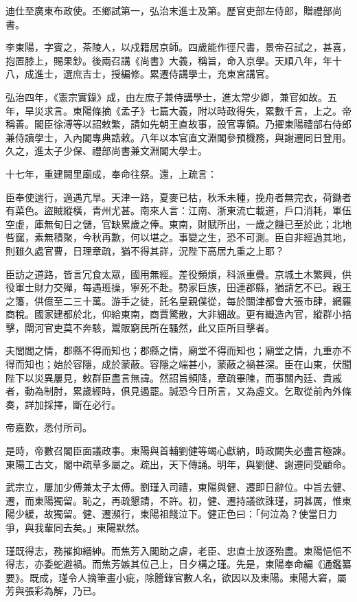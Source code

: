 \begin{pinyinscope}
迪仕至廣東布政使。丕鄉試第一，弘治末進士及第。歷官吏部左侍郎，贈禮部尚書。

李東陽，字賓之，茶陵人，以戍籍居京師。四歲能作徑尺書，景帝召試之，甚喜，抱置膝上，賜果鈔。後兩召講《尚書》大義，稱旨，命入京學。天順八年，年十八，成進士，選庶吉士，授編修。累遷侍講學士，充東宮講官。

弘治四年，《憲宗實錄》成，由左庶子兼侍講學士，進太常少卿，兼官如故。五年，旱災求言。東陽條摘《孟子》七篇大義，附以時政得失，累數千言，上之。帝稱善。閣臣徐溥等以詔敕繁，請如先朝王直故事，設官專領。乃擢東陽禮部右侍郎兼侍讀學士，入內閣專典誥敕。八年以本官直文淵閣參預機務，與謝遷同日登用。久之，進太子少保、禮部尚書兼文淵閣大學士。

十七年，重建闕里廟成，奉命往祭。還，上疏言：

臣奉使遄行，適遇亢旱。天津一路，夏麥已枯，秋禾未種，挽舟者無完衣，荷鋤者有菜色。盜賊縱橫，青州尤甚。南來人言：江南、浙東流亡載道，戶口消耗，軍伍空虛，庫無旬日之儲，官缺累歲之俸。東南，財賦所出，一歲之饑已至於此；北地呰窳，素無積聚，今秋再歉，何以堪之。事變之生，恐不可測。臣自非經過其地，則雖久處官曹，日理章疏，猶不得其詳，況陛下高居九重之上耶？

臣訪之道路，皆言冗食太眾，國用無經。差役頻煩，科派重疊。京城土木繁興，供役軍士財力交殫，每遇班操，寧死不赴。勢家巨族，田連郡縣，猶請乞不已。親王之籓，供億至二三十萬。游手之徒，託名皇親僕從，每於關津都會大張市肆，網羅商稅。國家建都於北，仰給東南，商賈驚散，大非細故。更有織造內官，縱群小掊擊，閘河官吏莫不奔駭，鬻販窮民所在騷然，此又臣所目擊者。

夫閭閻之情，郡縣不得而知也；郡縣之情，廟堂不得而知也；廟堂之情，九重亦不得而知也；始於容隱，成於蒙蔽。容隱之端甚小，蒙蔽之禍甚深。臣在山東，伏聞陛下以災異屢見，敕群臣盡言無諱。然詔旨頻降，章疏畢陳，而事關內廷、貴戚者，動為制肘，累歲經時，俱見遏罷。誠恐今日所言，又為虛文。乞取從前內外條奏，詳加採擇，斷在必行。

帝嘉歎，悉付所司。

是時，帝數召閣臣面議政事。東陽與首輔劉健等竭心獻納，時政闕失必盡言極諫。東陽工古文，閣中疏草多屬之。疏出，天下傳誦。明年，與劉健、謝遷同受顧命。

武宗立，屢加少傅兼太子太傅。劉瑾入司禮，東陽與健、遷即日辭位。中旨去健、遷，而東陽獨留。恥之，再疏懇請，不許。初，健、遷持議欲誅瑾，詞甚厲，惟東陽少緩，故獨留。健、遷瀕行，東陽祖餞泣下。健正色曰：「何泣為？使當日力爭，與我輩同去矣。」東陽默然。

瑾既得志，務摧抑縉紳。而焦芳入閣助之虐，老臣、忠直士放逐殆盡。東陽悒悒不得志，亦委蛇避禍。而焦芳嫉其位己上，日夕構之瑾。先是，東陽奉命編《通鑑纂要》。既成，瑾令人摘筆畫小疵，除謄錄官數人名，欲因以及東陽。東陽大窘，屬芳與張彩為解，乃已。


\end{pinyinscope}
